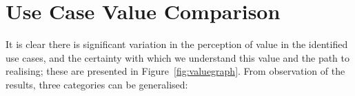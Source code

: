 \documentclass[b5paper,10pt]{article}
\begin{document}

\section{Use Case Value Comparison}\label{usecasecomp}


It is clear there is significant variation in the perception of value
in the identified use cases, and the certainty with which we understand
this value and the path to realising; these are presented in
Figure~\ref{fig:valuegraph}. From observation of the results, three
categories can be generalised:
\end{document}
